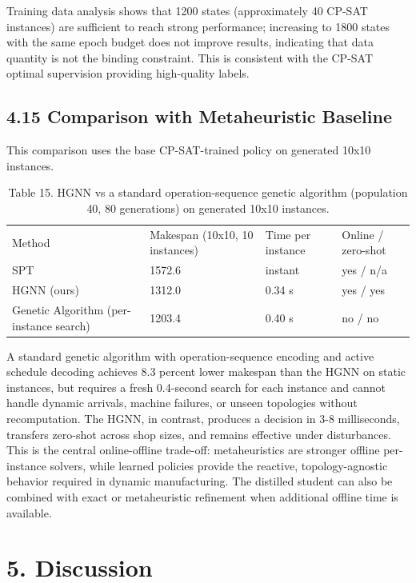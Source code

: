 \documentclass{article}
\begin{document}
Training data analysis shows that 1200 states (approximately 40 CP-SAT instances) are sufficient to reach strong performance; increasing to 1800 states with the same epoch budget does not improve results, indicating that data quantity is not the binding constraint. This is consistent with the CP-SAT optimal supervision providing high-quality labels.


\subsection*{4.15 Comparison with Metaheuristic Baseline}

This comparison uses the base CP-SAT-trained policy on generated 10x10 instances.

\begin{table}[h]
\centering
\begin{tabular}{llll}
\toprule
Method & Makespan (10x10, 10 instances) & Time per instance & Online / zero-shot \\
SPT & 1572.6 & instant & yes / n/a \\
HGNN (ours) & 1312.0 & 0.34 s & yes / yes \\
Genetic Algorithm (per-instance search) & 1203.4 & 0.40 s & no / no \\
\bottomrule
\end{tabular}
\caption{Table 15. HGNN vs a standard operation-sequence genetic algorithm (population 40, 80 generations) on generated 10x10 instances.}
\end{table}

A standard genetic algorithm with operation-sequence encoding and active schedule decoding achieves 8.3 percent lower makespan than the HGNN on static instances, but requires a fresh 0.4-second search for each instance and cannot handle dynamic arrivals, machine failures, or unseen topologies without recomputation. The HGNN, in contrast, produces a decision in 3-8 milliseconds, transfers zero-shot across shop sizes, and remains effective under disturbances. This is the central online-offline trade-off: metaheuristics are stronger offline per-instance solvers, while learned policies provide the reactive, topology-agnostic behavior required in dynamic manufacturing. The distilled student can also be combined with exact or metaheuristic refinement when additional offline time is available.


\section*{5. Discussion}
\end{document}
